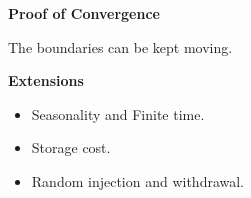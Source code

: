 \documentclass{beamer}
\begin{document}

\begin{frame}
{\bf Proof of Convergence}
\begin{Theorem}
The boundaries can be kept moving.
\end{Theorem}
\end{frame}


\begin{frame}
{\bf Extensions}

\begin{itemize}
  \item Seasonality and Finite time.
  \item Storage cost.
  \item Random injection and withdrawal.
\end{itemize}

\end{frame}
\end{document}
